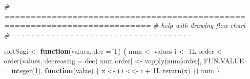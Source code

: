 \documentclass[
]{article}
\newenvironment{Shaded}{\begin{snugshade}}{\end{snugshade}}
\newcommand{\AttributeTok}[1]{\textcolor[rgb]{0.77,0.63,0.00}{#1}}
\newcommand{\CommentTok}[1]{\textcolor[rgb]{0.56,0.35,0.01}{\textit{#1}}}
\newcommand{\ControlFlowTok}[1]{\textcolor[rgb]{0.13,0.29,0.53}{\textbf{#1}}}
\newcommand{\DecValTok}[1]{\textcolor[rgb]{0.00,0.00,0.81}{#1}}
\newcommand{\FunctionTok}[1]{\textcolor[rgb]{0.00,0.00,0.00}{#1}}
\newcommand{\NormalTok}[1]{#1}
\newcommand{\OtherTok}[1]{\textcolor[rgb]{0.56,0.35,0.01}{#1}}
\newcommand{\SpecialCharTok}[1]{\textcolor[rgb]{0.00,0.00,0.00}{#1}}
\begin{document}
\begin{Shaded}
\begin{Highlighting}[]
\CommentTok{\# ==========================================================================}
\CommentTok{\# help with drawing flow chart}
\CommentTok{\# {-} {-} {-} {-} {-} {-} {-} {-} {-} {-} {-} {-} {-} {-} {-} {-} {-} {-} {-} {-} {-} {-} {-} {-} {-} {-} {-} {-} {-} {-} {-} {-} {-} {-} {-} {-} {-}}

\NormalTok{sortSugi }\OtherTok{\textless{}{-}} \ControlFlowTok{function}\NormalTok{(values, }\AttributeTok{dec =}\NormalTok{ T) \{}
\NormalTok{  num }\OtherTok{\textless{}{-}}\NormalTok{ values}
\NormalTok{  i }\OtherTok{\textless{}{-}}\NormalTok{ 1L}
\NormalTok{  order }\OtherTok{\textless{}{-}} \FunctionTok{order}\NormalTok{(values, }\AttributeTok{decreasing =}\NormalTok{ dec)}
\NormalTok{  num[order] }\OtherTok{\textless{}{-}} \FunctionTok{vapply}\NormalTok{(num[order],}
    \AttributeTok{FUN.VALUE =} \FunctionTok{integer}\NormalTok{(}\DecValTok{1}\NormalTok{),}
    \ControlFlowTok{function}\NormalTok{(value) \{}
\NormalTok{      x }\OtherTok{\textless{}{-}}\NormalTok{ i}
\NormalTok{      i }\OtherTok{\textless{}\textless{}{-}}\NormalTok{ i }\SpecialCharTok{+}\NormalTok{ 1L}
      \FunctionTok{return}\NormalTok{(x)}
\NormalTok{    \})}
\NormalTok{  num}
\NormalTok{\}}


\end{Highlighting}
\end{Shaded}
\end{document}
